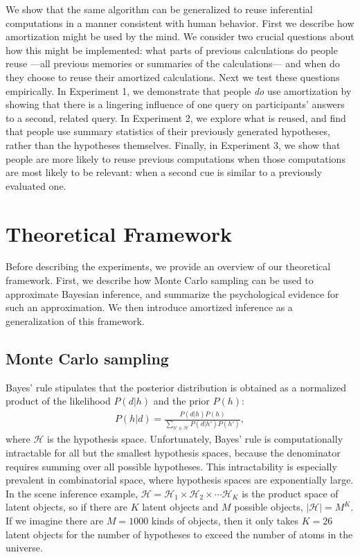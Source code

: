 We show that the same algorithm can be generalized to reuse inferential computations in a manner consistent with human behavior. First we describe how amortization might be used by the mind. We consider two crucial questions about how this might be implemented: what parts of previous calculations do people reuse ---all previous memories or summaries of the calculations--- and when do they choose to reuse their amortized calculations. Next we test these questions empirically. In Experiment 1, we demonstrate that people \emph{do} use amortization by showing that there is a lingering influence of one query on participants' answers to a second, related query. In Experiment 2, we explore what is reused, and find that people use summary statistics of their previously generated hypotheses, rather than the hypotheses themselves. Finally, in Experiment 3, we show that people are more likely to reuse previous computations when those computations are most likely to be relevant: when a second cue is similar to a previously evaluated one.

\section{Theoretical Framework}

Before describing the experiments, we provide an overview of our theoretical framework. First, we describe how Monte Carlo sampling can be used to approximate Bayesian inference, and summarize the psychological evidence for such an approximation. We then introduce amortized inference as a generalization of this framework.

\subsection{Monte Carlo sampling}
Bayes' rule stipulates that the posterior distribution is obtained as a normalized product of the likelihood $P(d|h)$ and the prior $P(h)$:
\begin{align}
P(h|d) = \frac{P(d|h)P(h)}{\sum_{h' \in \mathcal{H}} P(d|h') P(h')},
\end{align}
where $\mathcal{H}$ is the hypothesis space. Unfortunately, Bayes' rule is computationally intractable for all but the smallest hypothesis spaces, because the denominator requires summing over all possible hypotheses. This intractability is especially prevalent in combinatorial space, where hypothesis spaces are exponentially large. In the scene inference example, $\mathcal{H} = \mathcal{H}_1 \times \mathcal{H}_2 \times \cdots \mathcal{H}_K$ is the product space of latent objects, so if there are $K$ latent objects and $M$ possible objects, $|\mathcal{H}| = M^K$. If we imagine there are $M=1000$ kinds of objects, then it only takes $K=26$ latent objects for the number of hypotheses to exceed the number of atoms in the universe.

